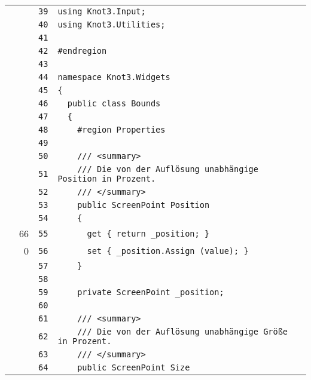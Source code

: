 \documentclass[a4paper,10pt]{article}
\begin{document}
\begin{longtable}[l]{lrrl}
\cellcolor{gray} &  & \verb~39~ & \verb~using Knot3.Input;~\\
\cellcolor{gray} &  & \verb~40~ & \verb~using Knot3.Utilities;~\\
\cellcolor{gray} &  & \verb~41~ & \verb~~\\
\cellcolor{gray} &  & \verb~42~ & \verb~#endregion~\\
\cellcolor{gray} &  & \verb~43~ & \verb~~\\
\cellcolor{gray} &  & \verb~44~ & \verb~namespace Knot3.Widgets~\\
\cellcolor{gray} &  & \verb~45~ & \verb~{~\\
\cellcolor{gray} &  & \verb~46~ & \verb~  public class Bounds~\\
\cellcolor{gray} &  & \verb~47~ & \verb~  {~\\
\cellcolor{gray} &  & \verb~48~ & \verb~    #region Properties~\\
\cellcolor{gray} &  & \verb~49~ & \verb~~\\
\cellcolor{gray} &  & \verb~50~ & \verb~    /// <summary>~\\
\cellcolor{gray} &  & \verb~51~ & \verb~    /// Die von der Auflösung unabhängige Position in Prozent.~\\
\cellcolor{gray} &  & \verb~52~ & \verb~    /// </summary>~\\
\cellcolor{gray} &  & \verb~53~ & \verb~    public ScreenPoint Position~\\
\cellcolor{gray} &  & \verb~54~ & \verb~    {~\\
\cellcolor{green} & 66 & \verb~55~ & \verb~      get { return _position; }~\\
\cellcolor{red} & 0 & \verb~56~ & \verb~      set { _position.Assign (value); }~\\
\cellcolor{gray} &  & \verb~57~ & \verb~    }~\\
\cellcolor{gray} &  & \verb~58~ & \verb~~\\
\cellcolor{gray} &  & \verb~59~ & \verb~    private ScreenPoint _position;~\\
\cellcolor{gray} &  & \verb~60~ & \verb~~\\
\cellcolor{gray} &  & \verb~61~ & \verb~    /// <summary>~\\
\cellcolor{gray} &  & \verb~62~ & \verb~    /// Die von der Auflösung unabhängige Größe in Prozent.~\\
\cellcolor{gray} &  & \verb~63~ & \verb~    /// </summary>~\\
\cellcolor{gray} &  & \verb~64~ & \verb~    public ScreenPoint Size~\\

\end{longtable}
\end{document}
